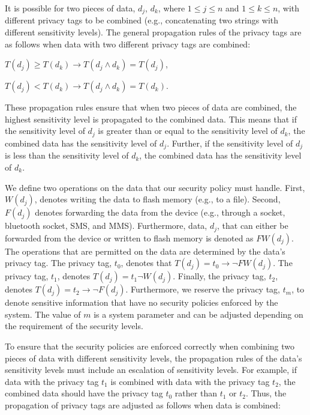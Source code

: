 It is possible for two pieces of data, $d_{j}$, $d_{k}$, where $1 \le
j \le n$ and $1 \le k \le n$,  with different privacy tags
to be combined (e.g., concatenating two strings with different
sensitivity levels).  The general propagation rules of the
privacy tags are as follows when data with two different privacy tags
are combined:

$T(d_{j}) \ge T(d_{k}) \to T(d_{j}\wedge d_{k}) = T(d_{j})$,

$T(d_{j}) < T(d_{k}) \to T(d_{j} \wedge d_{k}) = T(d_{k})$.

These propagation rules ensure that when two pieces of
data are combined, the highest sensitivity level is propagated
to the combined data.   This means that if the sensitivity
level of $d_{j}$ is greater than or equal to the sensitivity
level of $d_{k}$, the combined data has the sensitivity level
of $d_{j}$.  Further, if the sensitivity level of $d_{j}$ is
less than the sensitivity level of $d_{k}$, the combined data
has the sensitivity level of $d_{k}$.

We define two operations on the data that our security policy
must handle.  First, $W(d_{j})$, denotes writing the data to
flash memory (e.g., to a file). Second,
$F(d_{j})$ denotes forwarding the data from the device
(e.g., through a socket, bluetooth socket, SMS, and MMS).
Furthermore, data, $d_{j}$, that can either be forwarded from the
device or written to flash memory is denoted as $FW\left(d_{j}\right)$.
The operations that are permitted on the data are determined by the
data's privacy tag.  The privacy tag, $t_0$, denotes
that $T(d_{j}) = t_0 \to \lnot FW\left(d_{j}\right)$. The privacy tag,
$t_1$, denotes $T(d_{j}) = t_1\lnot W\left(d_{j}\right)$.  Finally,
the privacy tag, $t_2$, denotes 
$T(d_{j}) = t_2 \to \lnot F\left(d_{j}\right)$.  Furthermore, we reserve
the privacy tag, $t_m$, to denote sensitive information that have
no security policies enforced by the system.  The value of $m$ is a
system parameter and can be adjusted depending on the requirement of
the security levels. 

To ensure that the security policies are enforced correctly when
combining two pieces of data with different sensitivity levels,
the propagation rules of the data's sensitivity levels must
include an escalation of sensitivity levels.  For example, if
data with the privacy tag $t_1$ is combined with data with
the privacy tag $t_2$, the combined data should have the
privacy tag $t_0$ rather than $t_1$ or $t_2$.  Thus, the propagation
of privacy tags are adjusted as follows when data is combined:

